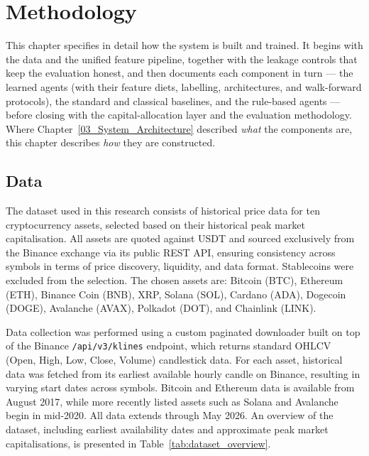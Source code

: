 \chapter{Methodology}
\label{04_Methodology}

This chapter specifies in detail how the system is built and trained. It begins with the data and the unified feature pipeline, together with the leakage controls that keep the evaluation honest, and then documents each component in turn --- the learned agents (with their feature diets, labelling, architectures, and walk-forward protocols), the standard and classical baselines, and the rule-based agents --- before closing with the capital-allocation layer and the evaluation methodology. Where Chapter~\ref{03_System_Architecture} described \textit{what} the components are, this chapter describes \textit{how} they are constructed.


\section{Data}
\label{sec:data}

The dataset used in this research consists of historical price data for ten cryptocurrency assets, selected based on their historical peak market capitalisation. All assets are quoted against USDT and sourced exclusively from the Binance exchange via its public REST API, ensuring consistency across symbols in terms of price discovery, liquidity, and data format. Stablecoins were excluded from the selection. The chosen assets are: Bitcoin (BTC), Ethereum (ETH), Binance Coin (BNB), XRP, Solana (SOL), Cardano (ADA), Dogecoin (DOGE), Avalanche (AVAX), Polkadot (DOT), and Chainlink (LINK).


Data collection was performed using a custom paginated downloader built on top of the Binance \texttt{/api/v3/klines} endpoint, which returns standard OHLCV (Open, High, Low, Close, Volume) candlestick data. For each asset, historical data was fetched from its earliest available hourly candle on Binance, resulting in varying start dates across symbols. Bitcoin and Ethereum data is available from August 2017, while more recently listed assets such as Solana and Avalanche begin in mid-2020. All data extends through May 2026. An overview of the dataset, including earliest availability dates and approximate peak market capitalisations, is presented in Table~\ref{tab:dataset_overview}.


